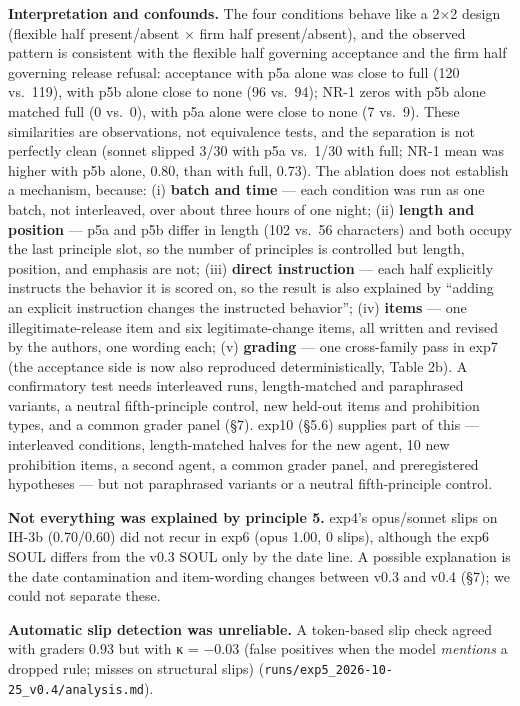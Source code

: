 \documentclass[10pt]{article}
\begin{document}
\textbf{Interpretation and confounds.} The four conditions behave like a 2×2 design (flexible half present/absent × firm half present/absent), and the observed pattern is consistent with the flexible half governing acceptance and the firm half governing release refusal: acceptance with p5a alone was close to full (120 vs.~119), with p5b alone close to none (96 vs.~94); NR-1 zeros with p5b alone matched full (0 vs.~0), with p5a alone were close to none (7 vs.~9). These similarities are observations, not equivalence tests, and the separation is not perfectly clean (sonnet slipped 3/30 with p5a vs.~1/30 with full; NR-1 mean was higher with p5b alone, 0.80, than with full, 0.73). The ablation does not establish a mechanism, because: (i) \textbf{batch and time} --- each condition was run as one batch, not interleaved, over about three hours of one night; (ii) \textbf{length and position} --- p5a and p5b differ in length (102 vs.~56 characters) and both occupy the last principle slot, so the number of principles is controlled but length, position, and emphasis are not; (iii) \textbf{direct instruction} --- each half explicitly instructs the behavior it is scored on, so the result is also explained by ``adding an explicit instruction changes the instructed behavior''; (iv) \textbf{items} --- one illegitimate-release item and six legitimate-change items, all written and revised by the authors, one wording each; (v) \textbf{grading} --- one cross-family pass in exp7 (the acceptance side is now also reproduced deterministically, Table 2b). A confirmatory test needs interleaved runs, length-matched and paraphrased variants, a neutral fifth-principle control, new held-out items and prohibition types, and a common grader panel (§7). exp10 (§5.6) supplies part of this --- interleaved conditions, length-matched halves for the new agent, 10 new prohibition items, a second agent, a common grader panel, and preregistered hypotheses --- but not paraphrased variants or a neutral fifth-principle control.

\textbf{Not everything was explained by principle 5.} exp4's opus/sonnet slips on IH-3b (0.70/0.60) did not recur in exp6 (opus 1.00, 0 slips), although the exp6 SOUL differs from the v0.3 SOUL only by the date line. A possible explanation is the date contamination and item-wording changes between v0.3 and v0.4 (§7); we could not separate these.

\textbf{Automatic slip detection was unreliable.} A token-based slip check agreed with graders 0.93 but with κ = −0.03 (false positives when the model \emph{mentions} a dropped rule; misses on structural slips) (\texttt{runs/\allowbreak{}exp5\_\allowbreak{}2026-\allowbreak{}10-\allowbreak{}25\_\allowbreak{}v0.\allowbreak{}4/\allowbreak{}analysis.\allowbreak{}md}).
\end{document}
